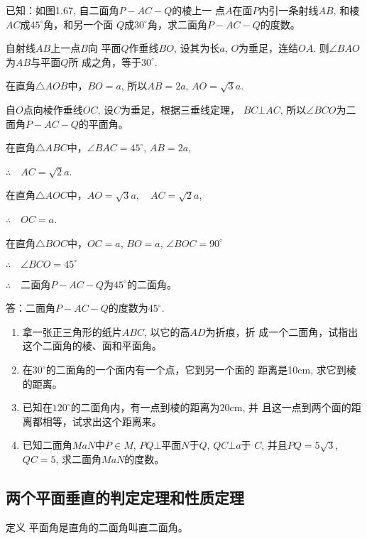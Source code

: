\begin{example}
  已知：如图1.67, 自二面角$P-AC-Q$的棱上一
  点$A$在面$P$内引一条射线$AB$, 和棱$AC$成$45^{\circ}$角，和另一个面
  $Q$成$30^{\circ}$角，求二面角$P-AC-Q$的度数。
\end{example}

\begin{solution}
    自射线$AB$上一点$B$向
平面$Q$作垂线$BO$, 设其为长$a$, 
$O$为垂足，连结$OA$.
则$\angle BAO$为$AB$与平面$Q$所
成之角，等于$30^{\circ}$.

在直角$\triangle AOB$中，$BO=a$, 
所以$AB=2a$, $AO=\sqrt{3}a$.

自$O$点向棱作垂线$OC$, 设$C$为垂足，根据三垂线定理，
$BC\bot AC$, 所以$\angle BCO$为二面角$P-AC-Q$的平面角。

在直角$\triangle ABC$中，$\angle BAC=45^{\circ}$, $AB=2a$, 

$\therefore\quad AC=\sqrt{2}a$.

在直角$\triangle AOC$中，$AO=\sqrt{3}a,\quad AC=\sqrt{2}a$,

$\therefore\quad OC=a$.

在直角$\triangle BOC$中，$OC=a$, $BO=a$, $\angle BOC=90^{\circ}$

$\therefore\quad \angle BCO=45^{\circ}$

$\therefore\quad $二面角$P-AC-Q$为$45^{\circ}$的二面角。

答：二面角$P-AC-Q$的度数为$45^{\circ}$.
\end{solution}

\begin{ex}
\begin{enumerate}
  \item 拿一张正三角形的纸片$ABC$, 以它的高$AD$为折痕，折
  成一个二面角，试指出这个二面角的棱、面和平面角。
  \item 在$30^{\circ}$的二面角的一个面内有一个点，它到另一个面的
  距离是10cm, 求它到棱的距离。
  \item 已知在$120^{\circ}$的二面角内，有一点到棱的距离为20cm, 并
  且这一点到两个面的距离都相等，试求出这个距离来。
  \item 已知二面角$MaN$中$P\in M$, $PQ\bot $平面$N$于$Q$, $QC\bot a$于
  $C$, 并且$PQ=5\sqrt{3}$, $QC=5$, 求二面角$MaN$的度数。
\end{enumerate}
\end{ex}

\subsection{两个平面垂直的判定定理和性质定理}
\begin{blk}
  {定义} 平面角是直角的二面角叫直二面角。
\end{blk}


